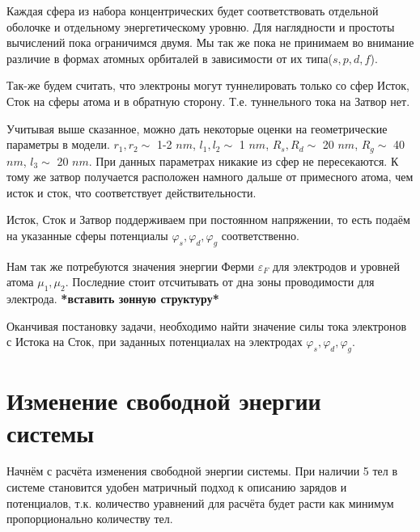 \documentclass[12pt,a4paper]{report}
\begin{document}
Каждая сфера из набора концентрических будет соответствовать отдельной оболочке и отдельному энергетическому уровню. Для наглядности и простоты вычислений пока ограничимся двумя. Мы так же пока не принимаем во внимание различие в формах атомных орбиталей в зависимости от их типа($s,p,d,f$). 

Так-же будем считать, что электроны могут туннелировать только со сфер Исток, Сток на сферы атома и в обратную сторону. Т.е. туннельного тока на Затвор нет.

Учитывая выше сказанное, можно дать некоторые оценки на геометрические параметры в модели. $r_1, r_2 \sim$ 1-2 $nm$, $l_1, l_2 \sim$ 1 $nm$, $R_s, R_d \sim$ 20 $nm$, $R_g \sim$ 40 $nm$, $l_3 \sim$ 20 $nm$. При данных параметрах никакие из сфер не пересекаются. К тому же затвор получается расположен намного дальше от примесного атома, чем исток и сток, что соответствует действительности. 

Исток, Сток и Затвор поддерживаем при постоянном напряжении, то есть подаём на указанные сферы потенциалы $\varphi_s, \varphi_d, \varphi_g$ соответственно.

Нам так же потребуются значения энергии Ферми $\varepsilon_F$ для электродов и уровней атома $\mu_1, \mu_2$. Последние стоит отсчитывать от дна зоны проводимости для электрода. \textbf{*вставить зонную структуру*}

Оканчивая постановку задачи, необходимо найти значение силы тока электронов с Истока на Сток, при заданных потенциалах на электродах $\varphi_s, \varphi_d, \varphi_g$.
\section{Изменение свободной энергии системы}
Начнём с расчёта изменения свободной энергии системы. При наличии 5 тел в системе становится удобен матричный подход к описанию зарядов и потенциалов, т.к. количество уравнений для расчёта будет расти как минимум пропорционально количеству тел.
\end{document}
